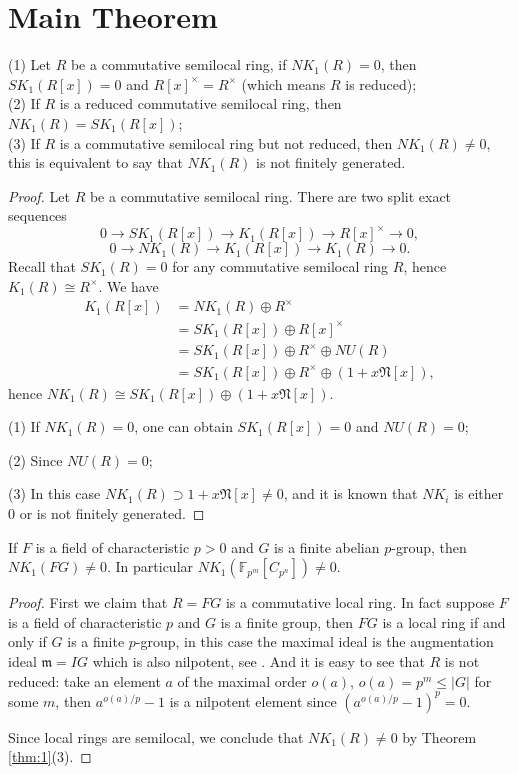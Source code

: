 \section{Main Theorem} %
\label{sec:main_theorem}
\begin{theorem}
\label{thm:1}
	(1) Let $R$ be a commutative semilocal ring, if $NK_1(R)=0$, then $SK_1(R[x])=0$ and $R[x]^{\times}=R^{\times}$ (which means $R$ is reduced);\\
	(2) If $R$ is a reduced commutative semilocal ring, then $NK_1(R)=SK_1(R[x])$;\\
	(3) If $R$ is a commutative semilocal ring but not reduced, then $NK_1(R)\neq 0$, this is equivalent to say that $NK_1(R)$ is not finitely generated.
\end{theorem}
\begin{proof}
	Let $R$ be a commutative semilocal ring. There are two split exact sequences
\[0\longrightarrow SK_1(R[x])\longrightarrow K_1(R[x])\longrightarrow R[x]^{\times}\longrightarrow 0, \]
\[0\longrightarrow NK_1(R)\longrightarrow K_1(R[x])\longrightarrow K_1(R)\longrightarrow 0. \]
Recall that $SK_1(R)=0$ for any commutative semilocal ring $R$, hence $K_1(R)\cong R^{\times}$.
We have
\begin{align*}
K_1(R[x]) & = NK_1(R)\oplus R^{\times} \\
		& = SK_1(R[x]) \oplus R[x]^{\times}\\
		& = SK_1(R[x]) \oplus R^{\times} \oplus NU(R)\\
		& = SK_1(R[x]) \oplus R^{\times} \oplus (1 + x\mathfrak{N}[x]),
\end{align*}
hence $NK_1(R)\cong SK_1(R[x])\oplus (1 + x\mathfrak{N}[x])$.

(1) If $NK_1(R)=0$, one can obtain $SK_1(R[x])=0$ and $NU(R)=0$;

(2) Since $NU(R)=0$;

(3) In this case $NK_1(R)\supset 1 + x\mathfrak{N}[x]\neq 0$, and it is known that $NK_i$ is either $0$ or is not finitely generated.
\end{proof}

\begin{theorem}
	If $F$ is a field of characteristic $p>0$ and $G$ is a finite abelian $p$-group, then $NK_1(FG)\neq 0$. In particular $NK_1(\mathbb{F}_{p^m}[C_{p^n}]) \neq 0$.
\end{theorem}
\begin{proof}
	First we claim that $R=FG$ is a commutative local ring. In fact suppose $F$ is a field of characteristic $p$ and $G$ is a finite group, then $FG$ is a local ring if and only if $G$ is a finite $p$-group, in this case the maximal ideal is the augmentation ideal $\mathfrak{m}=IG$ which is also nilpotent, see \cite{Iyengar2010Modules}. And it is easy to see that $R$ is not reduced: take an element $a$ of the maximal order $o(a)$, $o(a)= p^m \leq |G|$ for some $m$, then $a^{o(a)/p}-1$ is a nilpotent element since $(a^{o(a)/p}-1)^p=0$.

	Since local rings are semilocal, we conclude that $NK_1(R)\neq 0$ by Theorem \ref{thm:1}(3).
\end{proof}

